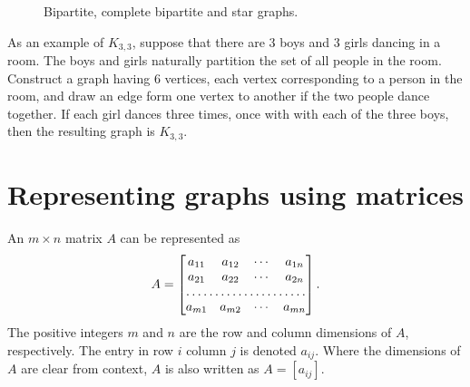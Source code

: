 \begin{figure}[!htbp]
\caption{Bipartite, complete bipartite and star graphs.}
\label{fig:introduction:bipartite_complete_bipartite_graphs}
\end{figure}

As an example of $K_{3,3}$, suppose that there are $3$ boys and $3$
girls dancing in a room. The boys and girls naturally partition the
set of all people in the room. Construct a graph having $6$ vertices,
each vertex corresponding to a person in the room, and draw an edge
form one vertex to another if the two people dance together. If each
girl dances three times, once with with each of the three boys, then
the resulting graph is $K_{3,3}$.



\section{Representing graphs using matrices}
\label{sec:introduction:matrix_representation}

An $m \times n$ matrix $A$ can be represented as
\[
A
=
\begin{bmatrix}
a_{11} & a_{12} & \cdots & a_{1n} \\
a_{21} & a_{22} & \cdots & a_{2n} \\
\hdotsfor{4} \\
a_{m1} & a_{m2} & \cdots & a_{mn} \\
\end{bmatrix}.
\]
The positive integers $m$ and $n$ are the row and column dimensions of
$A$, respectively. The entry in row $i$ column $j$ is denoted
$a_{ij}$. Where the dimensions of $A$ are clear from context, $A$ is
also written as $A = [a_{ij}]$.

